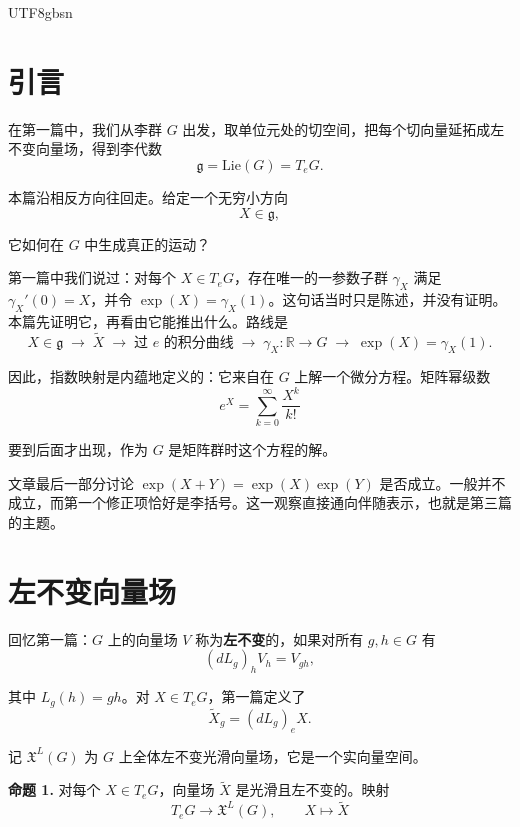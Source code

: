 \documentclass[11pt]{article}
\begin{document}
\begin{CJK*}{UTF8}{gbsn}

\maketitle

\section*{引言}

在第一篇中，我们从李群 $G$ 出发，取单位元处的切空间，把每个切向量延拓成左不变向量场，得到李代数
\[
\mathfrak{g} = \mathrm{Lie}(G) = T_eG.
\]

本篇沿相反方向往回走。给定一个无穷小方向
\[
X \in \mathfrak{g},
\]

它如何在 $G$ 中生成真正的运动？

第一篇中我们说过：对每个 $X \in T_eG$，存在唯一的一参数子群 $\gamma_X$ 满足 $\gamma_X'(0) = X$，并令 $\exp(X) = \gamma_X(1)$。这句话当时只是陈述，并没有证明。本篇先证明它，再看由它能推出什么。路线是
\[
X \in \mathfrak{g}
\;\longrightarrow\;
\widetilde{X}
\;\longrightarrow\;
\text{过 } e \text{ 的积分曲线}
\;\longrightarrow\;
\gamma_X : \mathbb{R} \to G
\;\longrightarrow\;
\exp(X) = \gamma_X(1).
\]

因此，指数映射是内蕴地定义的：它来自在 $G$ 上解一个微分方程。矩阵幂级数
\[
e^X = \sum_{k=0}^{\infty} \frac{X^k}{k!}
\]

要到后面才出现，作为 $G$ 是矩阵群时这个方程的解。

文章最后一部分讨论 $\exp(X + Y) = \exp(X)\exp(Y)$ 是否成立。一般并不成立，而第一个修正项恰好是李括号。这一观察直接通向伴随表示，也就是第三篇的主题。

\section{左不变向量场}

回忆第一篇：$G$ 上的向量场 $V$ 称为\textbf{左不变}的，如果对所有 $g, h \in G$ 有
\[
(dL_g)_h V_h = V_{gh},
\]

其中 $L_g(h) = gh$。对 $X \in T_eG$，第一篇定义了
\[
\widetilde{X}_g = (dL_g)_e X.
\]

记 $\mathfrak{X}^L(G)$ 为 $G$ 上全体左不变光滑向量场，它是一个实向量空间。

\textbf{命题 1.} 对每个 $X \in T_eG$，向量场 $\widetilde{X}$ 是光滑且左不变的。映射
\[
T_eG \longrightarrow \mathfrak{X}^L(G), \qquad X \longmapsto \widetilde{X}
\]


\end{CJK*}
\end{document}
